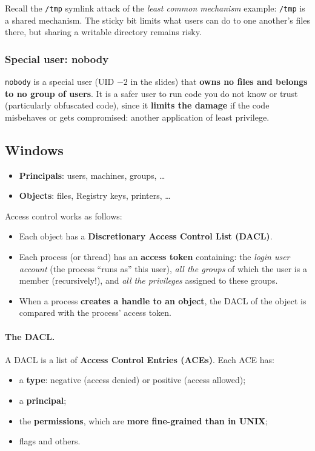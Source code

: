 \begin{remark}
Recall the \texttt{/tmp} symlink attack of the \emph{least common mechanism} example: \texttt{/tmp} is a shared mechanism. The sticky bit limits what users can do to one another's files there, but sharing a writable directory remains risky.
\end{remark}
\enlargethispage{3\baselineskip}
\subsubsection{Special user: nobody}

\texttt{nobody} is a special user (UID $-2$ in the slides) that \textbf{owns no files and belongs to no group of users}. It is a safer user to run code you do not know or trust (particularly obfuscated code), since it \textbf{limits the damage} if the code misbehaves or gets compromised: another application of least privilege.
\newpage
\subsection{Windows}

\begin{itemize}
    \item \textbf{Principals}: users, machines, groups, \dots
    \item \textbf{Objects}: files, Registry keys, printers, \dots
\end{itemize}

Access control works as follows:
\begin{itemize}
    \item Each object has a \textbf{Discretionary Access Control List (DACL)}.
    \item Each process (or thread) has an \textbf{access token} containing: the \emph{login user account} (the process ``runs as'' this user), \emph{all the groups} of which the user is a member (recursively!), and \emph{all the privileges} assigned to these groups.
    \item When a process \textbf{creates a handle to an object}, the DACL of the object is compared with the process' access token.
\end{itemize}

\paragraph{The DACL.} A DACL is a list of \textbf{Access Control Entries (ACEs)}. Each ACE has:
\begin{itemize}
    \item a \textbf{type}: negative (access denied) or positive (access allowed);
    \item a \textbf{principal};
    \item the \textbf{permissions}, which are \textbf{more fine-grained than in UNIX};
    \item flags and others.
\end{itemize}

